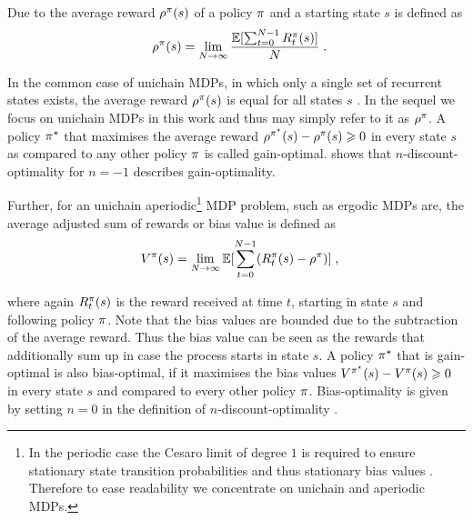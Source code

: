 \documentclass[envcountsame]{llncs}
\begin{document}
Due to \cite{Howard64} the average reward \(\rho^{\pi}(s)\) of a policy \(\pi\) and a starting
state \(s\) is defined as
\begin{align*}
  \avgrew^{\pol}(s) = \lim_{N \to \infty} \frac{\E [\sum_{t=0}^{N-1}R_{t}^{\pol}(s)]}{N}\tpkt
\end{align*}


In the common case of unichain MDPs, in which only a single set of recurrent states exists, the
average reward \(\rho^{\pi}(s)\) is equal for all states \(s\)
\citep{Mahadevan96_AverageRewardReinforcementLearningFoundationsAlgorithmsAndEmpiricalResults,Puterman94}.
In the sequel we focus on unichain MDPs in this work and thus may simply refer to it as
\(\rho^{\pi}\). A policy \(\pi^{\star}\) that maximises the average reward
\(\rho^{\pi^{\star}}(s) - \rho^{\pi}(s) \geqslant 0\) in every state \(s\) as compared to any
other policy \(\pi\) is called gain-optimal.
%
\citet{Mahadevan96_AnAveragerewardReinforcementLearningAlgorithmForComputingBiasoptimalPolicies}
shows that \(n\)-discount-optimality for \(n=-1\) describes gain-optimality.

Further, for an unichain aperiodic\footnote{In the periodic case the Cesaro limit of degree \(1\)
  is required to ensure stationary state transition probabilities and thus stationary bias
  values \citep{Puterman94}. Therefore to ease readability we concentrate on unichain
  and aperiodic MDPs.} MDP problem, such as ergodic MDPs are, the average adjusted sum of rewards or
bias value is defined as
\begin{align*}
  V^{\pol}(s) = \lim_{N \to \infty}{ \E [ \sum_{t=0}^{N-1}(R_{t}^{\pol}(s) - \avgrew^{\pol} )]}\tcom
\end{align*}


where again \(R_{t}^{\pi}(s)\) is the reward received at time \(t\), starting in state \(s\) and
following policy \(\pi\). Note that the bias values are bounded due to the subtraction of the
average reward. Thus the bias value can be seen as the rewards that additionally sum up in case the
process starts in state \(s\). A policy \(\pi^{\star}\) that is gain-optimal is also bias-optimal, if it
maximises the bias values \(V^{\pi^{\star}}(s) - V^{\pi}(s) \geqslant 0\) in every state \(s\) and
compared to every other policy \(\pi\). Bias-optimality is given by setting \(n=0\) in the
definition of \(n\)-discount-optimality
\citep{Mahadevan96_AnAveragerewardReinforcementLearningAlgorithmForComputingBiasoptimalPolicies}.
\end{document}

